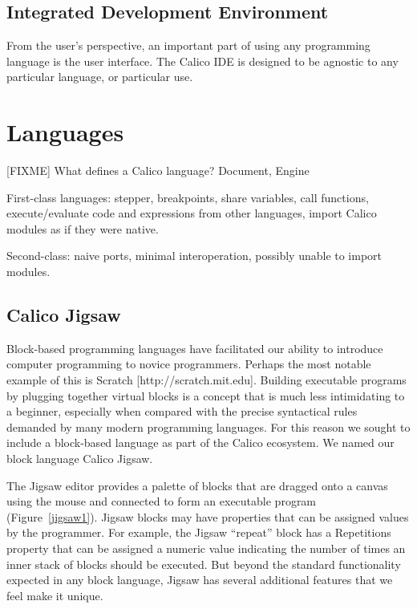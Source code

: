 \documentclass[preprint]{sigplanconf}
\begin{document}
\subsection{Integrated Development Environment}

From the user's perspective, an important part of using any
programming language is the user interface. The Calico IDE is designed
to be agnostic to any particular language, or particular use.

\section{Languages}

[FIXME] What defines a Calico language? Document, Engine

First-class languages: stepper, breakpoints, share variables, call
functions, execute/evaluate code and expressions from other languages,
import Calico modules as if they were native.

Second-class: naive ports, minimal interoperation, possibly unable to
import modules.

\subsection{Calico Jigsaw}

Block-based programming languages have facilitated our ability to
introduce computer programming to novice programmers. Perhaps the most
notable example of this is Scratch [http://scratch.mit.edu]. Building
executable programs by plugging together virtual blocks is a concept
that is much less intimidating to a beginner, especially when
compared with the precise syntactical rules demanded by many modern
programming languages. For this reason we sought to include a
block-based language as part of the Calico ecosystem. We named our
block language Calico Jigsaw.

The Jigsaw editor provides a palette of blocks that are dragged onto a
canvas using the mouse and connected to form an executable program
(Figure~\ref{jigsaw1}). Jigsaw blocks may have properties that can be assigned
values by the programmer. For example, the Jigsaw ``repeat'' block has
a Repetitions property that can be assigned a numeric value indicating
the number of times an inner stack of blocks should be executed. But
beyond the standard functionality expected in any block language,
Jigsaw has several additional features that we feel make it unique.
\end{document}
